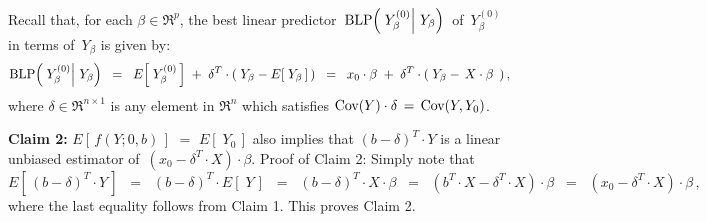 \vskip 0.3cm


\noindent
Recall that, for each $\beta \in \Re^{p}$, the best linear predictor
\,$\textnormal{BLP}\!\left(\,\left.Y^{(0)}_{\beta}\right\vert\,Y_{\beta}\right)$\, of
\,$Y^{(0)}_{\beta}$ in terms of \,$Y_{\beta}$ is given by:
\begin{equation*}
\textnormal{BLP}\!\left(\,\left.Y^{(0)}_{\beta}\right\vert\,Y_{\beta}\right)
\;\; = \;\;
	E\!\left[\;Y^{(0)}_{\beta}\,\right] \; + \; \delta^{T}\cdot(\;Y_{\beta} - E\!\left[\;Y_{\beta}\,\right]\,)
\;\; = \;\;
	x_{0}\cdot\beta \; + \; \delta^{T}\cdot(\;Y_{\beta} - \,X\cdot\beta\,\;)\,,
\end{equation*}
where $\delta \in \Re^{n \times 1}$ is any element in $\Re^{n}$ which satisfies
$\textnormal{Cov}(Y) \cdot \delta \,=\, \textnormal{Cov}(Y,Y_{0})$.

\vskip 0.5cm
\noindent
\textbf{Claim 2:}\quad
$E\!\left[\,f(Y;0,b)\,\right]$ $=$ $E\!\left[\;Y_{0}\,\right]$
also implies that
$(b - \delta)^{T}\cdot Y$ is a linear unbiased estimator of \,$(x_{0} - \delta^{T}\cdot X)\cdot\beta$.
\vskip 0.2cm
\noindent
Proof of Claim 2:\quad
Simply note that
\begin{equation*}
E\!\left[\,(b - \delta)^{T}\cdot Y\,\right]
\;\; = \;\;
	(b - \delta)^{T} \cdot E\!\left[\;Y\,\right]
\;\; = \;\;
	(b - \delta)^{T} \cdot X \cdot \beta
\;\; = \;\;
	(b^{T}\cdot X - \delta^{T} \cdot X) \cdot \beta
\;\; = \;\;
	(x_{0} - \delta^{T} \cdot X) \cdot \beta\,,
\end{equation*}
where the last equality follows from Claim 1.
This proves Claim 2.

